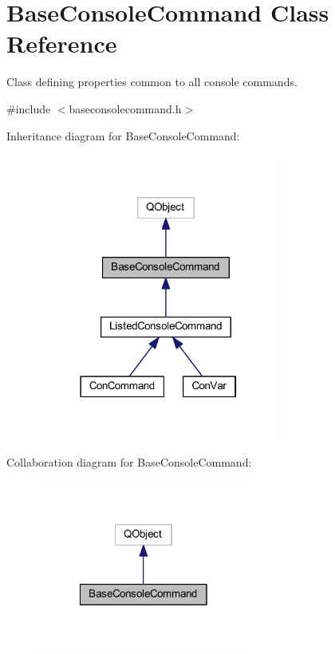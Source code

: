 \hypertarget{class_base_console_command}{\section{Base\-Console\-Command Class Reference}
\label{class_base_console_command}
}


Class defining properties common to all console commands.  




{\ttfamily \#include $<$baseconsolecommand.\-h$>$}



Inheritance diagram for Base\-Console\-Command\-:\nopagebreak
\begin{figure}[H]
\begin{center}
\leavevmode
\includegraphics[width=225pt]{class_base_console_command__inherit__graph}
\end{center}
\end{figure}


Collaboration diagram for Base\-Console\-Command\-:\nopagebreak
\begin{figure}[H]
\begin{center}
\leavevmode
\includegraphics[width=198pt]{class_base_console_command__coll__graph}
\end{center}
\end{figure}
